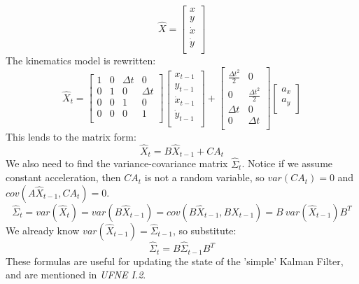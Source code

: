 \documentclass{article}
\begin{document}
\[
   \hat X =
  \left[ {\begin{array}{c}
   x \\
   y \\
   \dot x \\
   \dot y \\
  \end{array} } \right]
\]
The kinematics model is rewritten:
\[
	\hat X_t = \left[ {\begin{array}{cccc}
   1 & 0 & \Delta t & 0 \\
   0 & 1 & 0 & \Delta t \\
   0 & 0 & 1 & 0 \\
   0 & 0 & 0 & 1 \\
  \end{array} } \right] \left[ {\begin{array}{c}
   x_{t - 1} \\
   y_{t - 1} \\
   \dot x_{t - 1} \\
   \dot y_{t - 1} \\
  \end{array} } \right] + \left[ {\begin{array}{cc}
   \frac{\Delta t^2}{2} & 0 \\
   0 & \frac{\Delta t^2}{2} \\
   \Delta t & 0 \\
   0 & \Delta t \\
  \end{array} } \right] \left[ {\begin{array}{c}
   a_x \\
   a_y \\
  \end{array} } \right]
\]
This lends to the matrix form:
\[
	\hat X_t = B \hat X_{t - 1} + C A_t
\]
We also need to find the variance-covariance matrix $\hat \Sigma_t$. Notice if we assume constant acceleration, then $CA_t$ is not a random variable, so $var(CA_t) = 0$ and $cov(A \hat X_{t - 1}, C A_t) = 0$.
\[
	\hat \Sigma_{t} = var(\hat X_t) = var(B \hat X_{t - 1}) = cov(B \hat X_{t - 1}, B \hat X_{t-1}) = B \ var(\hat X_{t - 1}) B^T
\]
We already know $var(\hat X_{t - 1}) = \hat \Sigma_{t - 1}$, so substitute:
\[
	\hat \Sigma_t = B \hat \Sigma_{t - 1} B^T
\]
These formulas are useful for updating the state of the 'simple' Kalman Filter, and are mentioned in \textit{UFNE I.2}.
\end{document}
